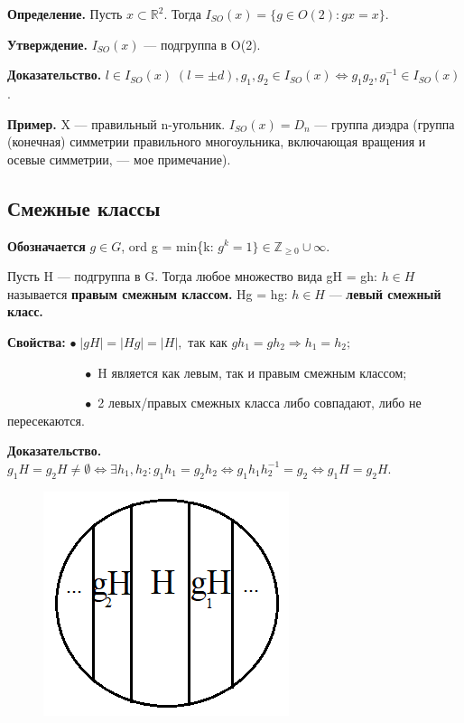 \documentclass[12pt,a4paper]{article}
\begin{document}
\textbf{Определение.} Пусть $x \subset \mathbb{R}^2$. Тогда $I_{SO}(x) = \{g \in O(2): gx = x\}.$ 

\textbf{Утверждение.} $I_{SO}(x)$ --- подгруппа в O(2). 

\textbf{Доказательство.} $l \in I_{SO}(x) \; (l = \pm d), g_{1}, g_{2} \in I_{SO}(x) \Leftrightarrow g_{1}g_{2}, g_{1}^{-1} \in I_{SO}(x)$. 

\textbf{Пример.} X --- правильный n-угольник. $I_{SO}(x) = D_{n}$ --- группа диэдра (группа (конечная) симметрии правильного многоульника, включающая вращения и осевые симметрии, --- мое примечание). 

\subsection{Смежные классы}

\textbf{Обозначается} $g \in G$, ord g = min\{k: $g^k = 1\} \in \mathbb{Z}_{\geq 0} \cup {\infty}.$

Пусть H --- подгруппа в G. Тогда любое множество вида gH = {gh: $h \in H$} называется \textbf{правым смежным классом.} Hg = {hg: $h \in H$} --- \textbf{левый смежный класс.} 

\textbf{Свойства:} $ \bullet \; |gH| = |Hg| = |H|,$ так как $gh_{1} = gh_{2} \Rightarrow h_{1} = h_{2};$

$\quad \quad \quad \quad \quad \quad \bullet$ H является как левым, так и правым смежным классом;

$\quad \quad \quad \quad \quad \quad\bullet$ 2 левых/правых смежных класса либо совпадают, либо не пересекаются. 

\textbf{Доказательство.} $g_{1}H = g_{2}H \neq \emptyset \Leftrightarrow \exists h_{1}, h_{2}: g_{1}h_{1} = g_{2}h_{2} \Leftrightarrow g_{1}h_{1}h_{2}^{-1} = g_{2} \Leftrightarrow g_{1}H = g_{2}H.$ 

\begin{figure}
	\includegraphics[width=0.8\linewidth]{Pic1}
\end{figure}
\end{document}
